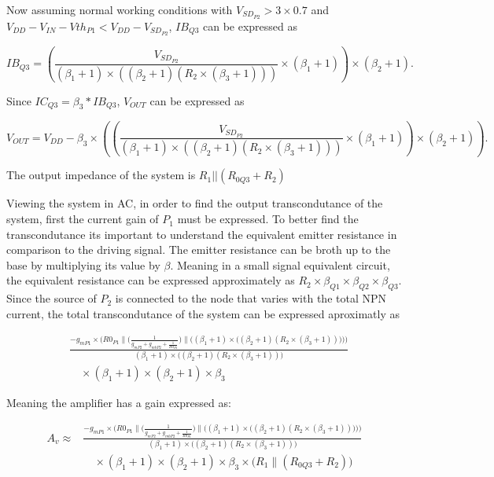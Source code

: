 \documentclass[12pt]{article}
\begin{document}
Now assuming normal working conditions with $V_{SD_{P2}} > 3 \times 0.7$ and   $ V_{DD} - V_{IN} - Vth_{P1} < V_{DD} - V_{SD_{P2}}$, $IB_{Q3}$ can be expressed as

 \[
    IB_{Q3} = (\frac{V_{SD_{P2}}}{(\beta_1+1) \times ((\beta_2 +1)(R_2 \times (\beta_3 +1) ))} \times (\beta_1 + 1) ) \times (\beta_2 + 1).
\]

Since $IC_{Q3} = \beta_3 * IB_{Q3}$, $V_{OUT}$ can be expressed as


 \[
    V_{OUT} = V_{DD} - \beta_3 \times ((\frac{V_{SD_{P2}}}{(\beta_1+1) \times ((\beta_2 +1)(R_2 \times (\beta_3 +1) ))} \times (\beta_1 + 1) ) \times (\beta_2 + 1)).
\]



 The output impedance of the system is $R_1 || (R_{0Q3}+R_2)$

 Viewing the system in AC, in order to find the output transcondutance of the system, first the current gain of $P_1$ must be expressed.
 To better find the transcondutance its important to understand the equivalent emitter resistance in comparison to the driving signal. The emitter resistance can be broth up to the base by multiplying its value by $\beta$. Meaning in a small signal equivalent circuit, the equivalent resistance can be expressed approximately as $R_2 \times \beta_{Q1} \times \beta_{Q2} \times \beta_{Q3}$. Since the source of $P_2$ is connected to the node that varies with the total NPN current, the total transcondutance of the system can be expressed aproximatly as 
 
\begin{align}
   &\frac{-g_{mP1} \times \bigg(R0_{P1} \parallel  
   \bigg(\frac{1}{g_{mP2} + g_{mbP2} + \frac{1}{R0_{P2}}}\bigg) \parallel  
   \bigg((\beta_1+1) \times \big((\beta_2 +1)(R_2 \times (\beta_3 +1))\big)\bigg)\bigg)} 
   {(\beta_1+1) \times \big((\beta_2 +1)(R_2 \times (\beta_3 +1))\big)} \nonumber \\
   &\quad \times (\beta_1+1) \times (\beta_2 +1) \times \beta_3
\end{align}

Meaning the amplifier has a gain expressed as:

\begin{align}
    A_v \approx &\frac{-g_{mP1} \times \bigg(R0_{P1} \parallel  
    \bigg(\frac{1}{g_{mP2} + g_{mbP2} + \frac{1}{R0_{P2}}}\bigg) \parallel  
    \bigg((\beta_1+1) \times \big((\beta_2 +1)(R_2 \times (\beta_3 +1))\big)\bigg)\bigg)} 
    {(\beta_1+1) \times \big((\beta_2 +1)(R_2 \times (\beta_3 +1))\big)} \nonumber \\
    &\quad \times (\beta_1+1) \times (\beta_2 +1) \times \beta_3 \times \big(R_1 \parallel (R_{0Q3} + R_2)\big)
\end{align}
\end{document}
